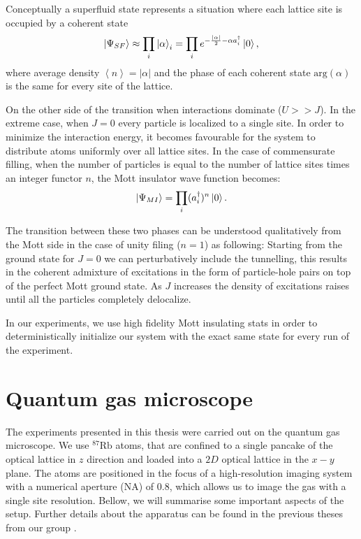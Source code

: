 Conceptually a superfluid state represents a situation where each lattice site is occupied by a coherent state
\begin{equation}
\left|\Psi_{SF}\right\rangle \approx\prod_i \left|\alpha\right\rangle_i=\prod_i e^{-\frac{\left| \alpha \right|}{2}-\alpha a^\dagger_i}\left|0\right\rangle,
\end{equation}
where average density $\left<n\right> = \left| \alpha \right|$ and the phase of each coherent state $\textrm{arg}(\alpha)$ is the same for every site of the lattice.

On the other side of the transition when interactions dominate ($U>>J$). In the extreme case, when $J=0$ every particle is localized to a single site. In order to minimize the interaction energy, it becomes favourable for the system to distribute atoms uniformly over all lattice sites. In the case of commensurate filling, when the number of particles is equal to the number of lattice sites times an integer functor $n$, the Mott insulator wave function becomes:
\begin{equation}
\left|\Psi_{MI}\right\rangle =\prod_i (a_i^\dagger)^n\left|0\right\rangle.
\end{equation}

The transition between these two phases can be understood qualitatively from the Mott side in the case of unity filing ($n=1$) as following: Starting from the ground state for $J=0$ we can perturbatively include the tunnelling, this results in the coherent admixture of excitations in the form of particle-hole pairs on top of the perfect Mott ground state. As $J$ increases the density of excitations raises until all the particles completely delocalize. 

In our experiments, we use high fidelity Mott insulating stats in order to deterministically initialize our system with the exact same state for every run of the experiment.

\section{Quantum gas microscope}
The experiments presented in this thesis were carried out on the quantum gas microscope. We use $^{87}\textrm{Rb}$ atoms, that are confined to a single pancake of the optical lattice in $z$ direction and loaded into a $2D$ optical lattice in the $x-y$ plane. The atoms are positioned in the focus of a high-resolution imaging system with a numerical aperture (NA) of $0.8$, which allows us to image the gas with a single site resolution. Bellow, we will summarise some important aspects of the setup. Further details about the apparatus can be found in the previous theses from our group \cite{PengThesis, GillenThesis, BakrThesis}.

